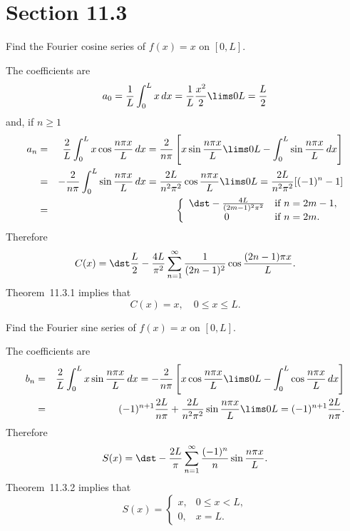 \section*{Section 11.3}
\setcounter{chapter}{11}
\setcounter{section}{3}

\setcounter{example}{0}
\begin{example}
  \label{example:11.3.1} \rm Find the Fourier cosine series of $f(x)=x$ on $[0,L]$.
\end{example}
\begin{examplesolution}
\solution The coefficients are
\[
  a_{0}=\frac{1}{L}\int_{0}^{L}x\,dx=\frac{1}{L}\frac{x^{2}}{2}\lims0L=\frac{L}{2}
\]
and, if $n\ge1$
\begin{eqnarray*}
  a_{n}&=&\frac{2}{L}\int_{0}^{L}x\cos\frac{n\pi x}{L}\,dx =\frac{2}{n\pi}\left[x\sin\frac{n\pi x}{L}\lims0L- \int_{0}^{L} \sin\frac{n\pi x}{L}\,dx\right]\\ &=&-\frac{2}{n\pi}\int_{0}^{L} \sin\frac{n\pi x}{L}\,dx =\frac{2L}{n^{2}\pi^{2}}\cos\frac{n\pi x}{L}\lims0L =\frac{2L}{n^{2}\pi^{2}}[(-1)^{n}-1]\\ &=& \left\{
  \begin{array}{cl}
    \dst-\frac{4L}{(2m-1)^{2}\pi^{2}} & \mbox{if $n=2m-1$}, \\
    0                                 & \mbox{if $n=2m$}.
  \end{array}\right.
\end{eqnarray*}
Therefore
\[
  C(x)=\dst\frac{L}{2}-\frac{4L}{\pi^{2}}\sum_{n=1}^{\infty}\frac{1}{(2n-1)^{2}}\cos\frac{(2n-1)\pi x}{L}.
\]
Theorem~11.3.1 implies that
\[
  C(x)=x,\quad0\le x\le L.
\]
\end{examplesolution}

\setcounter{example}{1}
\begin{example}
  \label{example:11.3.2} \rm Find the Fourier sine series of $f(x)=x$ on $[0,L]$.
\end{example}
\begin{examplesolution}
\solution The coefficients are
\begin{eqnarray*}
  b_{n} & = & \frac{2}{L}\int_{0}^{L}x\sin\frac{n\pi x}{L}\,dx=-\frac{2}{n\pi}\left[x\cos\frac{n\pi x}{L}\lims0L-\int_{0}^{L}\cos\frac{n\pi x}{L}\,dx\right] \\
        & = & (-1)^{n+1}\frac{2L}{n\pi}+\frac{2L}{n^{2}\pi^{2}}\sin\frac{n\pi x}{L}\lims0L=(-1)^{n+1}\frac{2L}{n\pi}.
\end{eqnarray*}
Therefore
\[
  S(x)=\dst-\frac{2L}{\pi}\sum_{n=1}^{\infty}\frac{(-1)^{n}}{n}\sin\frac{n\pi x}{L}.
\]
Theorem~11.3.2 implies that
\[
  S(x)= \left\{
  \begin{array}{cl}
    x, & 0\le x<L, \\
    0, & x=L.
  \end{array}\right.
\]
\end{examplesolution}

